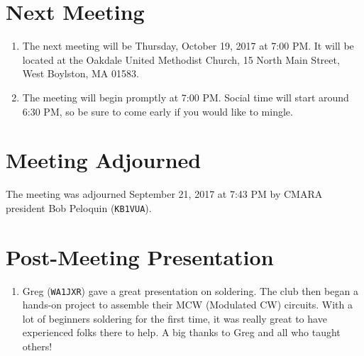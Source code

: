 \documentclass[10pt,letterpaper]{article}
\begin{document}
\section{Next Meeting}
\begin{enumerate}
  \item The next meeting will be Thursday, October 19, 2017 at 7:00 PM. It will be located at the Oakdale United Methodist Church, 15 North Main Street, West Boylston, MA 01583.
  \item The meeting will begin promptly at 7:00 PM. Social time will start around 6:30 PM, so be sure to come early if you would like to mingle.
\end{enumerate}

\section{Meeting Adjourned}
The meeting was adjourned September 21, 2017 at 7:43 PM by CMARA president Bob Peloquin (\texttt{KB1VUA}).

\section{Post-Meeting Presentation}
\begin{enumerate}
  \item Greg (\texttt{WA1JXR}) gave a great presentation on soldering. The club then began a hands-on project to assemble their MCW (Modulated CW) circuits. With a lot of beginners soldering for the first time, it was really great to have experienced folks there to help. A big thanks to Greg and all who taught others!
\end{enumerate}
\end{document}

